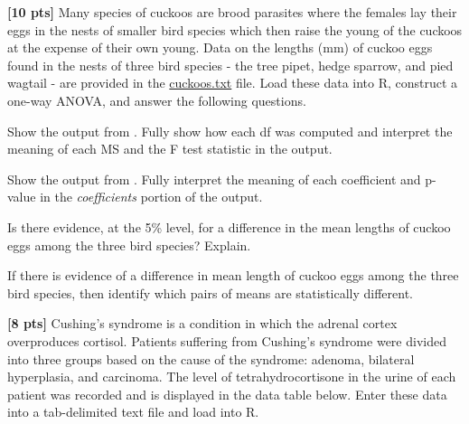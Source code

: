 \documentclass[10pt,openany]{book}\usepackage[]{graphicx}\usepackage[]{color}
\begin{document}
\begin{hwsection}
\newpage
  \item \label{hwprob:LMANOVA1Cuckoo} \textbf{[10 pts]} Many species of cuckoos are brood parasites where the females lay their eggs in the nests of smaller bird species which then raise the young of the cuckoos at the expense of their own young.  Data on the lengths (mm) of cuckoo eggs found in the nests of three bird species - the tree pipet, hedge sparrow, and pied wagtail - are provided in the \href{https://sites.google.com/site/ncstats/data/Cuckoos.txt}{cuckoos.txt} file.  Load these data into R, construct a one-way ANOVA, and answer the following questions.
    \begin{Enumerate}
      \item Show the output from .  Fully show how each df was computed and interpret the meaning of each MS and the F test statistic in the output.
      \item Show the output from .  Fully interpret the meaning of each coefficient and p-value in the \emph{coefficients} portion of the output.
      \item Is there evidence, at the 5\% level, for a difference in the mean lengths of cuckoo eggs among the three bird species?  Explain.
      \item If there is evidence of a difference in mean length of cuckoo eggs among the three bird species, then identify which pairs of means are statistically different.
    \end{Enumerate}

\vspace{18pt}
  \item \label{hwprob:LMANOVA1Cushings1} \textbf{[8 pts]} Cushing's syndrome is a condition in which the adrenal cortex overproduces cortisol.  Patients suffering from Cushing's syndrome were divided into three groups based on the cause of the syndrome: adenoma, bilateral hyperplasia, and carcinoma.  The level of tetrahydrocortisone in the urine of each patient was recorded and is displayed in the data table below.  Enter these data into a tab-delimited text file and load into R.


\end{hwsection}
\end{document}
